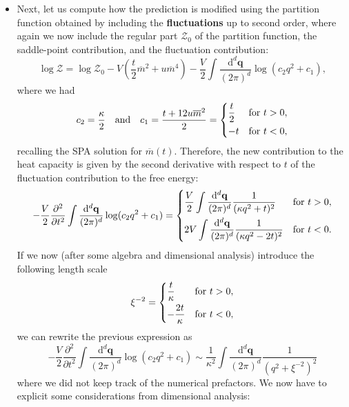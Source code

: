 \begin{itemize}
    \item Next, let us compute how the prediction is modified using the partition function obtained by including the \textbf{fluctuations} up to second order, where again we now include the regular part \( \mathcal{Z}_0 \) of the partition function, the saddle-point contribution, and the fluctuation contribution:
          \[
              \log \mathcal{Z} = \log \mathcal{Z}_0 - V\left( \frac{t}{2}\overline{m}^2 + u \overline{m}^4 \right) - \frac{V}{2} \int \frac{\mathrm{d}^d \mathbf{q}}{(2\pi)^d} \log(c_2 q^2 + c_1),
          \]
          where we had
          \[
              c_2 = \frac{\kappa}{2} \quad \text{and} \quad c_1 = \frac{t + 12u\overline{m}^2}{2} = \begin{dcases}
                  \frac{t}{2} & \text{for } t > 0, \\
                  -t          & \text{for } t < 0,
              \end{dcases}
          \]
          recalling the SPA solution for \( \overline{m}(t) \).
          Therefore, the new contribution to the heat capacity is given by the second derivative with respect to \( t \) of the fluctuation contribution to the free energy:
          \[
              -\frac{V}{2} \frac{\partial^2}{\partial t^2} \int \frac{\mathrm{d}^d \mathbf{q}}{(2\pi)^d} \log(c_2 q^2 + c_1) = \begin{dcases}
                  \frac{V}{2} \int \frac{\mathrm{d}^d \mathbf{q}}{(2\pi)^d} \frac{1}{(\kappa q^2 + t)^2} & \text{for } t > 0, \\
                  2V \int \frac{\mathrm{d}^d \mathbf{q}}{(2\pi)^d} \frac{1}{(\kappa q^2 - 2t)^2}         & \text{for } t < 0.
              \end{dcases}
          \]
          If we now (after some algebra and dimensional analysis) introduce the following length scale
          \[
              \xi^{-2} = \begin{dcases}
                  \frac{t}{\kappa}   & \text{for } t > 0, \\
                  -\frac{2t}{\kappa} & \text{for } t < 0,
              \end{dcases}
          \]
          we can rewrite the previous expression as
          \[
              -\frac{V}{2} \frac{\partial^2}{\partial t^2} \int \frac{\mathrm{d}^d \mathbf{q}}{(2\pi)^d} \log(c_2 q^2 + c_1) \sim \frac{1}{\kappa^2} \int \frac{\mathrm{d}^d \mathbf{q}}{(2\pi)^d} \frac{1}{(q^2 + \xi^{-2})^2}
          \]
          where we did not keep track of the numerical prefactors. We now have to explicit some considerations from dimensional analysis:

\end{itemize}
